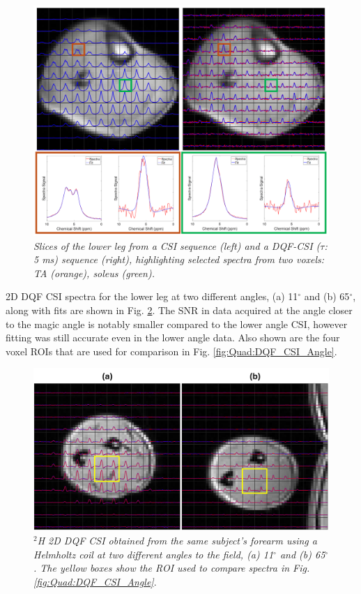 \begin{figure}
    \centering
    \includegraphics[width=1\textwidth]{Figures/Quad/SQFDQF_CSI_2.png}
    \caption{\textit{Slices of the lower leg from a \ac{CSI} sequence (left) and a \ac{DQF}-\ac{CSI} ($\tau$: 5 ms) sequence (right), highlighting selected spectra from two voxels: \ac{TA} (orange), soleus (green).}}
    \label{fig:Quad:SQFDQF_2}
\end{figure}

2D \ac{DQF} \ac{CSI} spectra for the lower leg at two different angles, (a) 11$^\circ$ and (b) 65$^\circ$, along with fits are shown in Fig. \ref{fig:Quad:Arm_DQF}. The \ac{SNR} in data acquired at the angle closer to the magic angle is notably smaller compared to the lower angle \ac{CSI}, however fitting was still accurate even in the lower angle data. Also shown are the four voxel \ac{ROI}s that are used for comparison in Fig. \ref{fig:Quad:DQF_CSI_Angle}.

\begin{figure}
    \centering
    \includegraphics[width=1\textwidth]{Figures/Quad/Arm_DQF.png}
    \caption{\textit{$^2$H 2D \ac{DQF} \ac{CSI} obtained from the same subject's forearm using a Helmholtz coil at two different angles to the field, (a) 11$^\circ$ and (b) 65$^\circ$. The yellow boxes show the \ac{ROI} used to compare spectra in Fig. \ref{fig:Quad:DQF_CSI_Angle}}.}
    \label{fig:Quad:Arm_DQF}
\end{figure}

